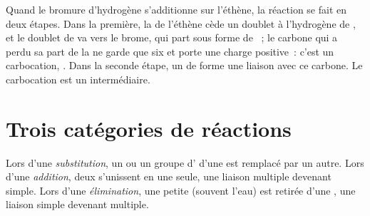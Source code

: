 \begin{example}\label{ex:g12:curly-arrows:carbocation}
Quand le bromure d'hydrogène s'additionne sur l'éthène, la réaction se
fait en deux étapes. Dans la première, la  de l'éthène
cède un doublet à l'hydrogène de
, et le doublet de  va vers le brome, qui part sous
forme de
~; le carbone qui a perdu sa part de la  ne garde
que six  et porte une charge positive~: c'est un carbocation,
. Dans la seconde étape, un  de 
forme une liaison avec ce carbone. Le carbocation est un intermédiaire.
\end{example}

\section{Trois catégories de réactions}

\begin{definition}\label{def:g12:curly-arrows:categories}
Lors d'une \emph{substitution}, un  ou un
groupe d' d'une  est remplacé par un autre. Lors d'une
\emph{addition}, deux  s'unissent en une seule,
une liaison multiple devenant simple. Lors d'une
\emph{élimination}, une petite  (souvent
l'eau) est retirée d'une , une liaison simple devenant multiple.
\end{definition}

